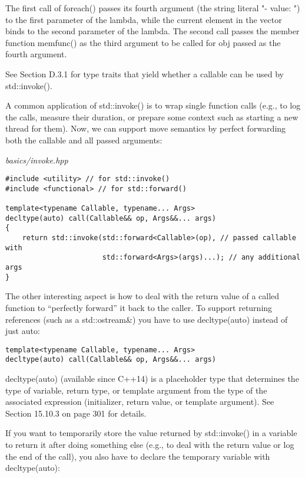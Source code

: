 The first call of foreach() passes its fourth argument (the string literal "- value: ") to the first parameter of the lambda, while the current element in the vector binds to the second parameter of the lambda. The second call passes the member function memfunc() as the third argument to be called for obj passed as the fourth argument.

See Section D.3.1 for type traits that yield whether a callable can be used by std::invoke().


A common application of std::invoke() is to wrap single function calls (e.g., to log the calls, measure their duration, or prepare some context such as starting a new thread for them). Now, we can support move semantics by perfect forwarding both the callable and all passed arguments:

\noindent
\textit{basics/invoke.hpp}
\begin{lstlisting}[style=styleCXX]
#include <utility> // for std::invoke()
#include <functional> // for std::forward()

template<typename Callable, typename... Args>
decltype(auto) call(Callable&& op, Args&&... args)
{
	return std::invoke(std::forward<Callable>(op), // passed callable with
					   std::forward<Args>(args)...); // any additional args
}
\end{lstlisting}

The other interesting aspect is how to deal with the return value of a called function to “perfectly forward” it back to the caller. To support returning references (such as a std::ostream\&) you have to use decltype(auto) instead of just auto:

\begin{lstlisting}[style=styleCXX]
template<typename Callable, typename... Args>
decltype(auto) call(Callable&& op, Args&&... args)
\end{lstlisting}

decltype(auto) (available since C++14) is a placeholder type that determines the type of variable, return type, or template argument from the type of the associated expression (initializer, return value, or template argument). See Section 15.10.3 on page 301 for details.

If you want to temporarily store the value returned by std::invoke() in a variable to return it after doing something else (e.g., to deal with the return value or log the end of the call), you also have to declare the temporary variable with decltype(auto):

